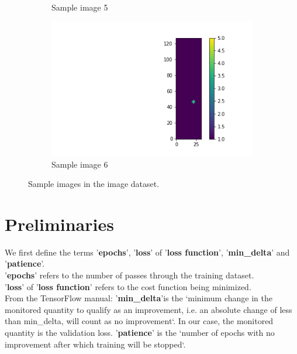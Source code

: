 \documentclass{article}
\begin{document}
\begin{figure}
\begin{subfigure}[b]{0.45\textwidth}
    \caption{Sample image 5}
  \end{subfigure}
  \begin{subfigure}[b]{0.45\textwidth}
    \centering
    \includegraphics[totalheight=4cm]{circle_id/sample5.png}
    \caption{Sample image 6}
  \end{subfigure}
\caption{\label{fig:sampleimages} Sample images in the image dataset.}
\end{figure}
%
\section{Preliminaries}
We first define the terms '\textbf{epochs}', '\textbf{loss}' of '\textbf{loss function}', '\textbf{min\_delta}' and '\textbf{patience}'. \\ '\textbf{epochs}' refers to the number of passes through the training dataset. \\'\textbf{loss}' of '\textbf{loss function}' refers to the cost function being minimized.\\ From the TensorFlow manual: '\textbf{min\_delta}'is the `minimum change in the monitored quantity to qualify as an improvement, i.e. an absolute change of less than min\_delta, will count as no improvement`. In our case, the monitored quantity is the validation loss. '\textbf{patience}' is the `number of epochs with no improvement after which training will be stopped`.
\end{document}
